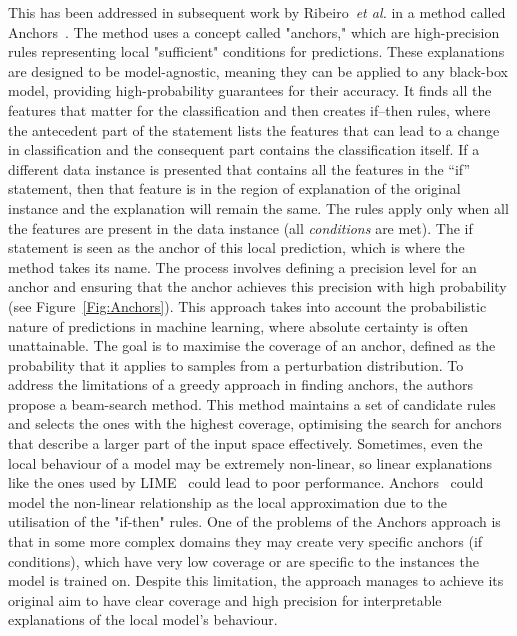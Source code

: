 This has been addressed in subsequent work by Ribeiro~\textit{et al.} in a method called Anchors~\cite{Ribeiro0G18}. The method uses a concept called "anchors," which are high-precision rules representing local "sufficient" conditions for predictions. These explanations are designed to be model-agnostic, meaning they can be applied to any black-box model, providing high-probability guarantees for their accuracy. It finds all the features that matter for the classification and then creates if--then rules, where the antecedent part of the statement lists the features that can lead to a change in classification and the consequent part contains the classification itself. If a different data instance is presented that contains all the features in the ``if'' statement, then that feature is in the region of explanation of the original instance and the explanation will remain the same. The rules apply only when all the features are present in the data instance (all \emph{conditions} are met). The if statement is seen as the anchor of this local prediction, which is where the method takes its name. 
The process involves defining a precision level for an anchor and ensuring that the anchor achieves this precision with high probability (see Figure~\ref{Fig:Anchors}). This approach takes into account the probabilistic nature of predictions in machine learning, where absolute certainty is often unattainable. The goal is to maximise the coverage of an anchor, defined as the probability that it applies to samples from a perturbation distribution. To address the limitations of a greedy approach in finding anchors, the authors propose a beam-search method. This method maintains a set of candidate rules and selects the ones with the highest coverage, optimising the search for anchors that describe a larger part of the input space effectively. Sometimes, even the local behaviour of a model may be
extremely non-linear, so linear explanations like the ones used by LIME~\cite{Ribeiro0G16} could lead to poor performance. Anchors~\cite{Ribeiro0G18} could model the non-linear relationship as the local approximation due to the utilisation of the "if-then" rules. One of the problems of the Anchors approach is that in some more complex domains they may create very specific anchors (if conditions), which have very low coverage or are specific to the instances the model is trained on. Despite this limitation, the approach manages to achieve its original aim to have clear coverage and high precision for interpretable explanations of the local model's behaviour. 


